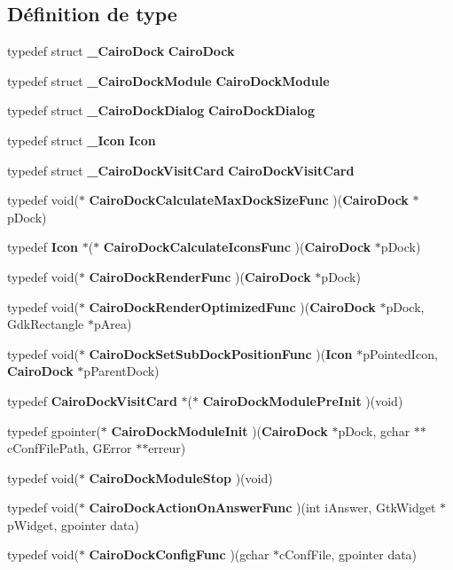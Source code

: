 \subsection*{Définition de type}
\begin{CompactItemize}
\item 
typedef struct {\bf \_\-CairoDock} {\bf CairoDock}
\item 
typedef struct {\bf \_\-CairoDockModule} {\bf CairoDockModule}
\item 
typedef struct {\bf \_\-CairoDockDialog} {\bf CairoDockDialog}
\item 
typedef struct {\bf \_\-Icon} {\bf Icon}
\item 
typedef struct {\bf \_\-CairoDockVisitCard} {\bf CairoDockVisitCard}
\item 
typedef void($\ast$ {\bf CairoDockCalculateMaxDockSizeFunc} )({\bf CairoDock} $\ast$pDock)
\item 
typedef {\bf Icon} $\ast$($\ast$ {\bf CairoDockCalculateIconsFunc} )({\bf CairoDock} $\ast$pDock)
\item 
typedef void($\ast$ {\bf CairoDockRenderFunc} )({\bf CairoDock} $\ast$pDock)
\item 
typedef void($\ast$ {\bf CairoDockRenderOptimizedFunc} )({\bf CairoDock} $\ast$pDock, GdkRectangle $\ast$pArea)
\item 
typedef void($\ast$ {\bf CairoDockSetSubDockPositionFunc} )({\bf Icon} $\ast$pPointedIcon, {\bf CairoDock} $\ast$pParentDock)
\item 
typedef {\bf CairoDockVisitCard} $\ast$($\ast$ {\bf CairoDockModulePreInit} )(void)
\item 
typedef gpointer($\ast$ {\bf CairoDockModuleInit} )({\bf CairoDock} $\ast$pDock, gchar $\ast$$\ast$cConfFilePath, GError $\ast$$\ast$erreur)
\item 
typedef void($\ast$ {\bf CairoDockModuleStop} )(void)
\item 
typedef void($\ast$ {\bf CairoDockActionOnAnswerFunc} )(int iAnswer, GtkWidget $\ast$pWidget, gpointer data)
\item 
typedef void($\ast$ {\bf CairoDockConfigFunc} )(gchar $\ast$cConfFile, gpointer data)
\end{CompactItemize}
